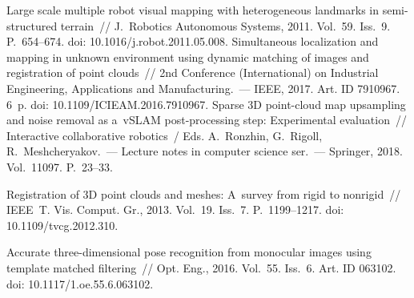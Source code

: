 \begin{multicols}{2}
{\small\frenchspacing
 {\baselineskip=11.5pt
 \begin{thebibliography}{99}
 Large scale multiple 
robot visual mapping with heterogeneous landmarks in semi-structured terrain~// 
J.~Robotics Autonomous Systems, 2011. Vol.~59. Iss.~9. P.~654--674. doi: 
10.1016/j.robot.2011.05.008.
 Simultaneous localization and 
mapping in unknown environment using dynamic matching of images and 
registration of point clouds~// 2nd Conference (\mbox{International}) on Industrial 
Engineering, Applications and Manufacturing.~--- IEEE, 2017. Art. ID 7910967. 
6~p. doi: 10.1109/ICIEAM.2016.7910967.
 Sparse 3D point-cloud map upsampling and noise 
removal as a~vSLAM post-processing step: Experimental evaluation~// 
Interactive collaborative robotics~/ 
Eds. A.~Ronzhin, G.~Rigoll, R.~Meshcheryakov.~--- Lecture 
notes in computer science ser.~--- Springer, 2018. Vol.~11097. P.~23--33.

 Registration of 3D point clouds and meshes: A~survey 
from rigid to nonrigid~// IEEE~T. Vis. Comput. Gr., 2013. Vol.~19. Iss.~7. 
P.~1199--1217. doi: 10.1109/tvcg.2012.310.

 Accurate three-dimensional pose recognition from monocular 
images using template matched filtering~// Opt. Eng., 2016. Vol.~55. 
Iss.~6. Art. ID 063102. doi: 10.1117/1.oe.55.6.063102.


\end{thebibliography}}}
\end{multicols}
